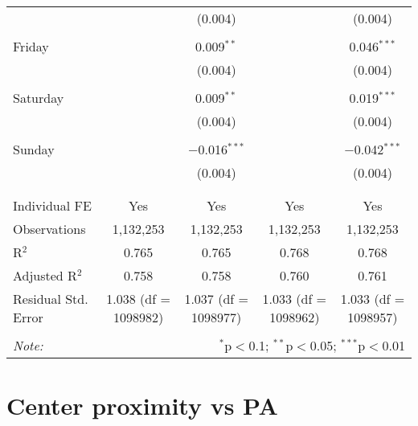 \documentclass[
]{article}
\begin{document}
\begin{table}[!htbp]
{\begin{tabular}{@{\extracolsep{5pt}}lcccc}
  &  & (0.004) &  & (0.004) \\ 
  & & & & \\ 
 Friday &  & 0.009$^{**}$ &  & 0.046$^{***}$ \\ 
  &  & (0.004) &  & (0.004) \\ 
  & & & & \\ 
 Saturday &  & 0.009$^{**}$ &  & 0.019$^{***}$ \\ 
  &  & (0.004) &  & (0.004) \\ 
  & & & & \\ 
 Sunday &  & $-$0.016$^{***}$ &  & $-$0.042$^{***}$ \\ 
  &  & (0.004) &  & (0.004) \\ 
  & & & & \\ 
\hline \\[-1.8ex] 
Individual FE & Yes & Yes & Yes & Yes \\ 
Observations & 1,132,253 & 1,132,253 & 1,132,253 & 1,132,253 \\ 
R$^{2}$ & 0.765 & 0.765 & 0.768 & 0.768 \\ 
Adjusted R$^{2}$ & 0.758 & 0.758 & 0.760 & 0.761 \\ 
Residual Std. Error & 1.038 (df = 1098982) & 1.037 (df = 1098977) & 1.033 (df = 1098962) & 1.033 (df = 1098957) \\ 
\hline 
\hline \\[-1.8ex] 
\textit{Note:}  & \multicolumn{4}{r}{$^{*}$p$<$0.1; $^{**}$p$<$0.05; $^{***}$p$<$0.01} \\ 
\end{tabular}
} 
\end{table} 
\newpage
\section{Center proximity vs PA}
\end{document}
